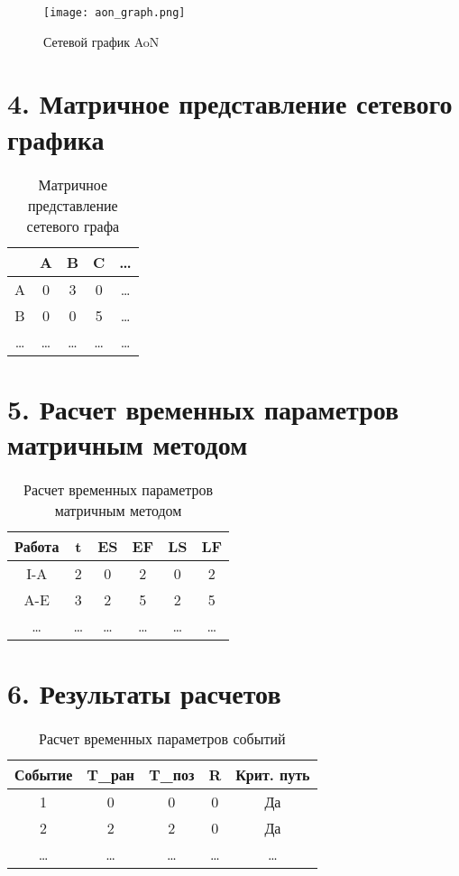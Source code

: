 \documentclass[12pt]{article}
\begin{document}
\begin{figure}[H]
    \centering
    \texttt{[image: aon\_graph.png]}
    \caption{Сетевой график AoN}
\end{figure}

\section*{4. Матричное представление сетевого графика}
\begin{table}[H]
    \centering
    \begin{tabular}{|c|c|c|c|c|}
        \hline
        & A & B & C & \ldots \\
        \hline
        A & 0 & 3 & 0 & \ldots \\
        \hline
        B & 0 & 0 & 5 & \ldots \\
        \hline
        \ldots & \ldots & \ldots & \ldots & \ldots \\
        \hline
    \end{tabular}
    \caption{Матричное представление сетевого графа}
\end{table}

\section*{5. Расчет временных параметров матричным методом}
\begin{table}[H]
    \centering
    \begin{tabular}{|c|c|c|c|c|c|}
        \hline
        Работа & t & ES & EF & LS & LF \\
        \hline
        I-A & 2 & 0 & 2 & 0 & 2 \\
        \hline
        A-E & 3 & 2 & 5 & 2 & 5 \\
        \hline
        \ldots & \ldots & \ldots & \ldots & \ldots & \ldots \\
        \hline
    \end{tabular}
    \caption{Расчет временных параметров матричным методом}
\end{table}

\section*{6. Результаты расчетов}
\begin{table}[H]
    \centering
    \begin{tabular}{|c|c|c|c|c|}
        \hline
        Событие & T\_ран & T\_поз & R & Крит. путь \\
        \hline
        1 & 0 & 0 & 0 & Да \\
        \hline
        2 & 2 & 2 & 0 & Да \\
        \hline
        \ldots & \ldots & \ldots & \ldots & \ldots \\
        \hline
    \end{tabular}
    \caption{Расчет временных параметров событий}
\end{table}
\end{document}
